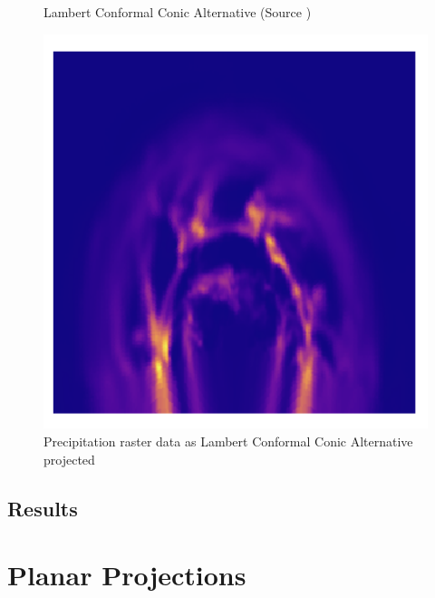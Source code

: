 \begin{figure}[h]
\begin{minipage}{0.30\textwidth}
        \caption{Lambert Conformal Conic Alternative (Source \cite{PROJ_SITE})}
        \label{fig:lcca_proj}
    \end{minipage}\hfill
    \begin{minipage}{0.30\textwidth}
        \centering
        \includegraphics[width=0.9\linewidth]{figures/chapter-8/prect_lcca.png}
        \caption{Precipitation raster data as Lambert Conformal Conic Alternative projected}
        \label{fig:lcca_prect_raster}
    \end{minipage}\hfill
\end{figure}

\subsection{Results}



\newpage
\section{Planar Projections}


